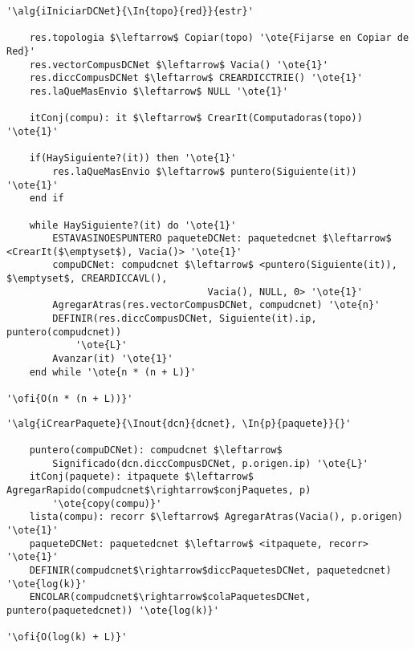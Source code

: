 \begin{lstlisting}[mathescape]
'\alg{iIniciarDCNet}{\In{topo}{red}}{estr}'
	
    res.topologia $\leftarrow$ Copiar(topo) '\ote{Fijarse en Copiar de Red}'
    res.vectorCompusDCNet $\leftarrow$ Vacia() '\ote{1}'
    res.diccCompusDCNet $\leftarrow$ CREARDICCTRIE() '\ote{1}'
    res.laQueMasEnvio $\leftarrow$ NULL '\ote{1}'

    itConj(compu): it $\leftarrow$ CrearIt(Computadoras(topo)) '\ote{1}'

    if(HaySiguiente?(it)) then '\ote{1}'
    	res.laQueMasEnvio $\leftarrow$ puntero(Siguiente(it)) '\ote{1}'
    end if

    while HaySiguiente?(it) do '\ote{1}'
    	ESTAVASINOESPUNTERO paqueteDCNet: paquetedcnet $\leftarrow$ <CrearIt($\emptyset$), Vacia()>	'\ote{1}'
    	compuDCNet: compudcnet $\leftarrow$ <puntero(Siguiente(it)), $\emptyset$, CREARDICCAVL(), 
    							   Vacia(), NULL, 0> '\ote{1}'
    	AgregarAtras(res.vectorCompusDCNet, compudcnet) '\ote{n}'
    	DEFINIR(res.diccCompusDCNet, Siguiente(it).ip, puntero(compudcnet)) 
    		'\ote{L}'
    	Avanzar(it) '\ote{1}'
    end while '\ote{n * (n + L)}'

'\ofi{O(n * (n + L))}'
\end{lstlisting}

\begin{lstlisting}[mathescape]
'\alg{iCrearPaquete}{\Inout{dcn}{dcnet}, \In{p}{paquete}}{}'
	
	puntero(compuDCNet): compudcnet $\leftarrow$ 
		Significado(dcn.diccCompusDCNet, p.origen.ip) '\ote{L}'	
	itConj(paquete): itpaquete $\leftarrow$ AgregarRapido(compudcnet$\rightarrow$conjPaquetes, p) 
		'\ote{copy(compu)}'
	lista(compu): recorr $\leftarrow$ AgregarAtras(Vacia(), p.origen) '\ote{1}'
	paqueteDCNet: paquetedcnet $\leftarrow$ <itpaquete, recorr> '\ote{1}'
	DEFINIR(compudcnet$\rightarrow$diccPaquetesDCNet, paquetedcnet) '\ote{log(k)}'
	ENCOLAR(compudcnet$\rightarrow$colaPaquetesDCNet, puntero(paquetedcnet)) '\ote{log(k)}'

'\ofi{O(log(k) + L)}'
\end{lstlisting}

